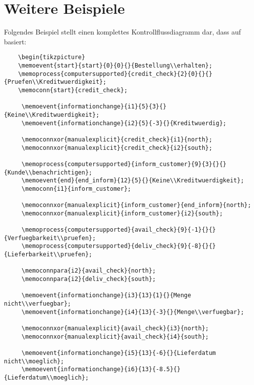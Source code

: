 \documentclass[12pt, a4paper]{article}
\begin{document}
\section{Weitere Beispiele}
\label{sec:Beispiele}
Folgendes Beispiel stellt einen komplettes Kontrollflussdiagramm dar, dass auf \cite[][S. 92]{Frank:MEMOOrgML2} basiert:
\begin{lstlisting}
    \begin{tikzpicture}
    \memoevent{start}{start}{0}{0}{}{Bestellung\\erhalten};
    \memoprocess{computersupported}{credit_check}{2}{0}{}{}{Pruefen\\Kreditwuerdigkeit};
    \memoconn{start}{credit_check};
    
     \memoevent{informationchange}{i1}{5}{3}{}{Keine\\Kreditwuerdigkeit};
     \memoevent{informationchange}{i2}{5}{-3}{}{Kreditwuerdig};
     
     \memoconnxor{manualexplicit}{credit_check}{i1}{north};
     \memoconnxor{manualexplicit}{credit_check}{i2}{south};
     
     \memoprocess{computersupported}{inform_customer}{9}{3}{}{}{Kunde\\benachrichtigen};
     \memoevent{end}{end_inform}{12}{5}{}{Keine\\Kreditwuerdigkeit};
     \memoconn{i1}{inform_customer};
     
     \memoconnxor{manualexplicit}{inform_customer}{end_inform}{north};
     \memoconnxor{manualexplicit}{inform_customer}{i2}{south};
     
     \memoprocess{computersupported}{avail_check}{9}{-1}{}{}{Verfuegbarkeit\\pruefen};
     \memoprocess{computersupported}{deliv_check}{9}{-8}{}{}{Lieferbarkeit\\pruefen};
     
     \memoconnpara{i2}{avail_check}{north};
     \memoconnpara{i2}{deliv_check}{south};
     
     \memoevent{informationchange}{i3}{13}{1}{}{Menge nicht\\verfuegbar};
     \memoevent{informationchange}{i4}{13}{-3}{}{Menge\\verfuegbar};
     
     \memoconnxor{manualexplicit}{avail_check}{i3}{north};
     \memoconnxor{manualexplicit}{avail_check}{i4}{south};
     
     \memoevent{informationchange}{i5}{13}{-6}{}{Lieferdatum nicht\\moeglich};
     \memoevent{informationchange}{i6}{13}{-8.5}{}{Lieferdatum\\moeglich};
     

\end{lstlisting}
\end{document}
